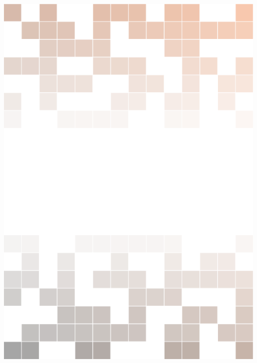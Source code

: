 
\renewcommand{\titlepage}[2]{
	\thispagestyle{empty} %

	\begin{tikzpicture}[remember picture, overlay]
		\node [inner sep=0pt] at (current page.center) {#1}; %
		\node [anchor=center, inner sep=1.25cm, rectangle, text opacity=1, minimum height=\paperheight, minimum width=\paperwidth, text width=0.8\paperwidth] at (current page.center) {#2}; %
	\end{tikzpicture}

	\newpage
}
\titlepage %
	{\includegraphics[width=\paperwidth,height=\paperheight]{images/cover.png}} %
